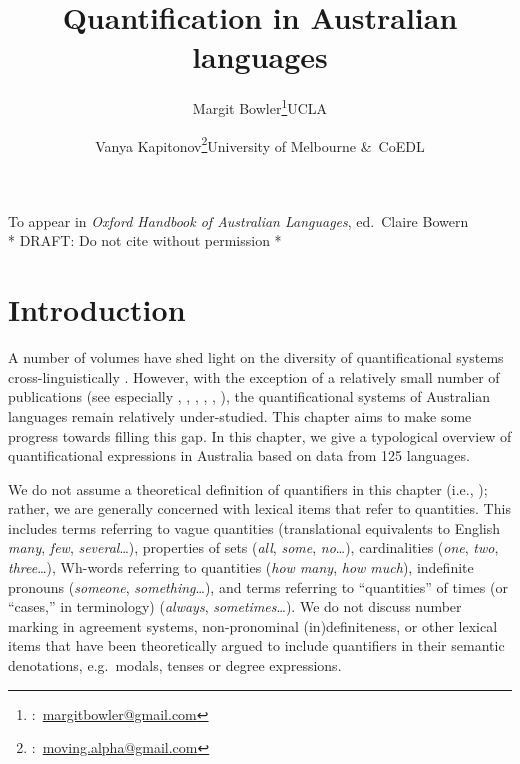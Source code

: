 \documentclass[12pt,egregdoesnotlikesansseriftitles]{scrartcl}
\title{Quantification in Australian languages}
\author{Margit Bowler\thanks{\Letter:~\href{mailto:margitbowler@gmail.com}{margitbowler@gmail.com}}\authorcr UCLA \and \vspace{-.5cm}Vanya Kapitonov\thanks{\Letter:~\href{mailto:moving.alpha@gmail.com}{moving.alpha@gmail.com}}\authorcr University of Melbourne \&\ CoEDL}
\begin{document}
\maketitle

\begin{center}
To appear in \textit{Oxford Handbook of Australian Languages}, ed.\ Claire Bowern\\
* DRAFT: Do not cite without permission *
\end{center}

\section{Introduction}

A number of volumes have shed light on the diversity of quantificational systems cross-linguistically \citep{bachetal95,qclp08,keenanpaperno12,keenanpaperno17}. However, with the exception of a relatively small number of publications (see especially \citealt{bowler17}, \citealt{bowernzentz12}, \citealt{alpher01},  \citealt{bittnerhale95}, \citealt{evans95}, \citealt{laughren81}), the quantificational systems of Australian languages remain relatively under-studied. This chapter aims to make some progress towards filling this gap. In this chapter, we give a typological overview of quantificational expressions in Australia based on data from 125 languages.

We do not assume a theoretical definition of quantifiers in this chapter (i.e., \citealt{heimkratzer98}); rather, we are generally concerned with lexical items that refer to quantities. This includes terms referring to vague quantities (translational equivalents to English \textit{many}, \textit{few}, \textit{several}\ldots), properties of sets (\textit{all}, \textit{some}, \textit{no}\ldots), cardinalities (\textit{one}, \textit{two}, \textit{three}\ldots), Wh-words referring to quantities (\textit{how many}, \textit{how much}), indefinite pronouns (\textit{someone}, \textit{something}\ldots), and terms referring to ``quantities'' of times (or ``cases,'' in  terminology) (\textit{always}, \textit{sometimes}\ldots). We do not discuss number marking in agreement systems, non-pronominal (in)definiteness, or other lexical items that have been theoretically argued to include quantifiers in their semantic denotations, e.g.\ modals, tenses or degree expressions.

\end{document}
